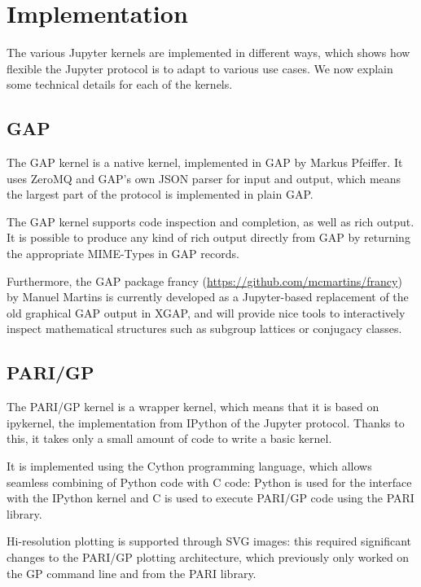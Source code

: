 \documentclass{deliverablereport}
\begin{document}
\section{Implementation}

The various Jupyter kernels are implemented in different ways, which shows how flexible
the Jupyter protocol is to adapt to various use cases. We now explain some technical details for each of the kernels.

\subsection{GAP}

The GAP kernel is a native kernel, implemented in GAP by Markus Pfeiffer. It uses ZeroMQ and GAP's own JSON
parser for input and output, which means the largest part of the protocol is implemented in plain GAP.

The GAP kernel supports code inspection and completion, as well as rich output. It is possible to produce
any kind of rich output directly from GAP by returning the appropriate MIME-Types in GAP records.

Furthermore, the GAP package francy (\url{https://github.com/mcmartins/francy}) by Manuel Martins is
currently developed as a Jupyter-based replacement of the old graphical GAP output in XGAP,
and will provide nice tools to interactively inspect mathematical structures such as subgroup lattices
or conjugacy classes.


\subsection{PARI/GP}

The PARI/GP kernel is a wrapper kernel, which means that it is based on ipykernel, the implementation from IPython of the Jupyter protocol.
Thanks to this, it takes only a small amount of code to write a basic kernel.

It is implemented using the Cython programming language,
which allows seamless combining of Python code with C code:
Python is used for the interface with the IPython kernel and C is used to execute PARI/GP code
using the PARI library.

Hi-resolution plotting is supported through SVG images: this required significant changes to the PARI/GP
plotting architecture, which previously only worked on the GP command line and from the PARI library.
\end{document}
